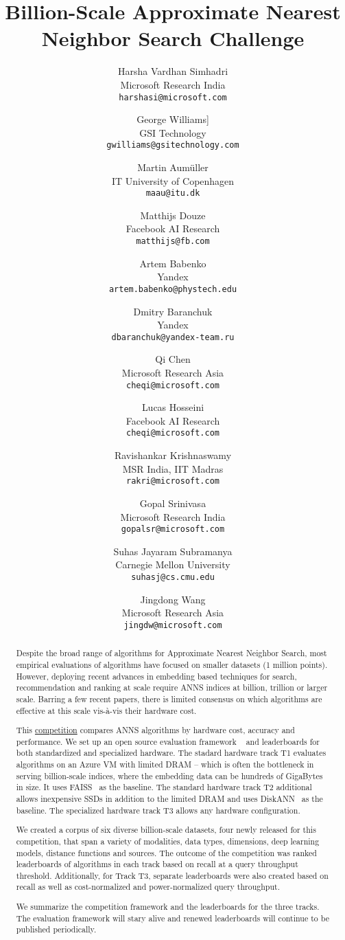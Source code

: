 \documentclass[11pt, oneside]{article}
\title{
\vspace{-40pt}
  Billion-Scale Approximate Nearest Neighbor Search Challenge}
\author{
\hspace{-20pt}  \footnotesize{Harsha Vardhan Simhadri}   \\ \hspace{-20pt} \scriptsize{Microsoft Research India} \\ \hspace{-20pt} \scriptsize{\tt harshasi@microsoft.com} \and
\hspace{-25pt}  \footnotesize{George Williams}] \\ \hspace{-25pt} \scriptsize{GSI Technology} \\ \hspace{-25pt} \scriptsize{\tt gwilliams@gsitechnology.com} \and
\hspace{-25pt}  \footnotesize{Martin Aum\"uller} \\\hspace{-30pt} \scriptsize{IT University of Copenhagen} \\ \hspace{-25pt} \scriptsize{\tt maau@itu.dk}  \and
\hspace{-20pt}  \footnotesize{Matthijs Douze} \\ \hspace{-15pt} \scriptsize{Facebook AI Research} \\ \hspace{-20pt} \scriptsize{\tt matthijs@fb.com} \and
\hspace{-25pt}  \footnotesize{Artem Babenko} \\ \hspace{-40pt} \scriptsize{Yandex} \\ \hspace{-40pt} \scriptsize{\tt artem.babenko@phystech.edu} \and
\hspace{-20pt}  \footnotesize{Dmitry Baranchuk} \\ \hspace{-20pt} \scriptsize{Yandex} \\ \hspace{-20pt} \scriptsize{\tt dbaranchuk@yandex-team.ru} \and
\hspace{-20pt}  \footnotesize{Qi Chen} \\ \hspace{-20pt} \scriptsize{Microsoft Research Asia}\\ \hspace{-20pt} \scriptsize{\tt cheqi@microsoft.com} \and
\hspace{-20pt}  \footnotesize{Lucas Hosseini} \\ \hspace{-20pt} \scriptsize{Facebook AI Research}\\ \hspace{-20pt} \scriptsize{\tt cheqi@microsoft.com} \and
\hspace{-20pt}  \footnotesize{Ravishankar Krishnaswamy} \\ \hspace{-20pt} \scriptsize{MSR India, IIT Madras} \\ \hspace{-20pt} \scriptsize{\tt rakri@microsoft.com} \and
  \footnotesize{Gopal Srinivasa} \\\scriptsize{Microsoft Research India} \\ \scriptsize{\tt gopalsr@microsoft.com} \and
  \footnotesize{Suhas Jayaram Subramanya} \\\scriptsize{Carnegie Mellon University}\\ \scriptsize{\tt suhasj@cs.cmu.edu} \and
  \footnotesize{Jingdong Wang} \\\scriptsize{Microsoft Research Asia}\\ \scriptsize{\tt jingdw@microsoft.com} 
}
\begin{document}
\maketitle
\vspace{-20pt}
\begin{abstract}
  Despite the broad range of algorithms for Approximate Nearest
  Neighbor Search, most empirical evaluations of algorithms have
  focused on smaller datasets (1 million points). However, deploying
  recent advances in embedding based techniques for search,
  recommendation and ranking at scale require ANNS indices at billion,
  trillion or larger scale. Barring a few recent papers, there is
  limited consensus on which algorithms are effective at this scale
  vis-\`a-vis their hardware cost.

  This \href{https://big-ann-benchmarks.com}{competition} compares
  ANNS algorithms by hardware cost, accuracy and performance. We set
  up an open source evaluation framework ~\cite{framework} and
  leaderboards for both standardized and specialized hardware.  The
  stadard hardware track T1 evaluates algorithms on an Azure VM with
  limited DRAM -- which is often the bottleneck in serving
  billion-scale indices, where the embedding data can be hundreds of
  GigaBytes in size.  It uses FAISS~\cite{Faiss17} as the baseline.
  The standard hardware track T2 additional allows inexpensive SSDs in
  addition to the limited DRAM and uses DiskANN~\cite{DiskANN19} as
  the baseline.  The specialized hardware track T3 allows any hardware
  configuration.
  
  We created a corpus of six diverse billion-scale datasets, four
  newly released for this competition, that span a variety of
  modalities, data types, dimensions, deep learning models, distance
  functions and sources.  The outcome of the competition was ranked
  leaderboards of algorithms in each track based on recall at a query
  throughput threshold. Additionally, for Track T3, separate
  leaderboards were also created based on recall as well as
  cost-normalized and power-normalized query throughput.

  We summarize the competition framework and the leaderboards for the
  three tracks.  The evaluation framework will stary alive and renewed
  leaderboards will continue to be published periodically.
  
\end{abstract}











\end{document}

